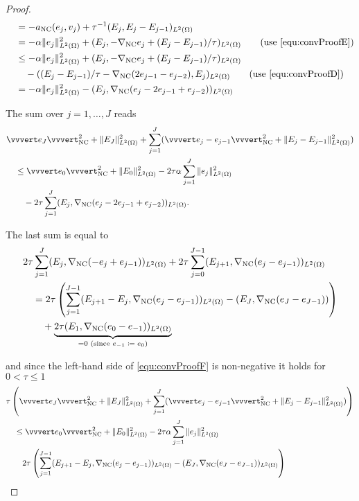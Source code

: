 \begin{proof}
\begin{align*}
    &\quad =
    -a_\nc(e_j,v_j) + \tau^{-1}(E_j,E_j-E_{j-1})_{L^2(\Omega)}\\
    &\quad =
    -\alpha\Vert e_j\Vert_{L^2(\Omega)}^2 + (E_j,
    -\nabla_\nc e_j+(E_j-E_{j-1})/\tau)_{L^2(\Omega)} 
    \tag{use \eqref{equ:convProofE}}\\
    &\quad \leq
    -\alpha\Vert e_j\Vert_{L^2(\Omega)}^2 + (E_j,
    -\nabla_\nc e_j+(E_j-E_{j-1})/\tau)_{L^2(\Omega)}\\ 
    &\quad\quad -( (E_j-E_{j-1})/\tau -\gradnc(2e_{j-1}-e_{j-2}),E_j)_{L^2(\Omega)}
    \tag{use \eqref{equ:convProofD}}\\
    &\quad =
    -\alpha\Vert e_j\Vert_{L^2(\Omega)}^2 - 
    (E_j,\gradnc(e_j-2e_{j-1}+e_{j-2}))_{L^2(\Omega)}
  \end{align*}

  \noindent The sum over $j=1,\ldots,J$ reads
  \begin{align}
    \label{equ:convProofF}
    &\vvvert e_J \vvvert^2_\nc +\Vert E_J \Vert_{L^2(\Omega)}^2 
    +\sum_{j=1}^J(\vvvert e_j-e_{j-1} \vvvert_\nc^2 + 
    \Vert E_j-E_{j-1}\Vert_{L^2(\Omega)}^2)\notag \\
    &\quad \leq 
    \vvvert e_0 \vvvert_\nc^2 + \Vert E_0 \Vert_{L^2(\Omega)}^2 
    -2\tau\alpha\sum_{j=1}^J \Vert e_j\Vert^2_{L^2(\Omega)}\notag \\
    &\quad\quad
    -2\tau \sum_{j=1}^J(E_j,\gradnc (e_j-2e_{j-1}+e_{j-2}))_{L^2(\Omega)}.
  \end{align}

  \noindent The last sum is equal to
  \begin{align*}
    &2\tau\sum_{j=1}^J(E_j,\nabla_\textup{NC}(-e_j+e_{j-1}))_{L^2(\Omega)} +
    2\tau\sum_{j=0}^{J-1}(E_{j+1},\nabla_\textup{NC}(e_j-e_{j-1}))_{L^2(\Omega)} \\
    &\quad = 
    2\tau\left( 
    \sum_{j=1}^{J-1} 
    (E_{j+1}-E_j,\nabla_\textup{NC}(e_j-e_{j-1}))_{L^2(\Omega)}
    -(E_J,\nabla_\textup{NC}(e_J-e_{J-1}))\right)\\
    &\quad\quad +
    \underbrace{2\tau(E_1,
    \nabla_\textup{NC}(e_0-e_{-1}))_{L^2(\Omega)}}_{=0 \text{ (since 
    $e_{-1}\coloneqq e_0$)}}
  \end{align*}

  \noindent and since the left-hand side of
  \eqref{equ:convProofF} is non-negative it holds for $0<\tau\leq 1$ 
  \begin{align*}
    &\tau\left(\vvvert e_J \vvvert^2_\nc +\Vert E_J \Vert_{L^2(\Omega)}^2 
    +\sum_{j=1}^J(\vvvert e_j-e_{j-1} \vvvert_\nc^2 + 
    \Vert E_j-E_{j-1}\Vert_{L^2(\Omega)}^2)\right) \\
    &\quad \leq 
    \vvvert e_0 \vvvert_\nc^2 + \Vert E_0 \Vert_{L^2(\Omega)}^2 
    -2\tau\alpha\sum_{j=1}^J \Vert e_j\Vert^2_{L^2(\Omega)} \\
    &\quad\quad
    2\tau\left( 
    \sum_{j=1}^{J-1} 
    (E_{j+1}-E_j,\gradnc(e_j-e_{j-1}))_{L^2(\Omega)}
    -(E_J,\gradnc(e_J-e_{J-1}))_{L^2(\Omega)}\right)
  \end{align*}
  

\end{proof}
